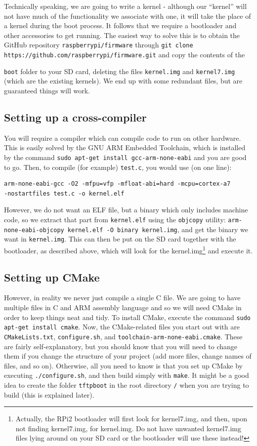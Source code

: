 \documentclass[a4paper,11pt,reqno]{amsart}
\begin{document}
Technically speaking, we are going to write a kernel - although our ``kernel'' will not have much of the functionality we associate with one, it will take the place of a kernel during the boot process. It follows that we require a bootloader and other accessories to get running. The easiest way to solve this is to obtain the GitHub repository \texttt{raspberrypi/firmware} through \texttt{git clone https://github.com/raspberrypi/firmware.git} and copy the contents of the {\texttt{boot} folder to your SD card, deleting the files \texttt{kernel.img} and \texttt{kernel7.img} (which are the existing kernels). We end up with some redundant files, but are guaranteed things will work.

\subsection{Setting up a cross-compiler}
You will require a compiler which can compile code to run on other hardware. This is easily solved by the GNU ARM Embedded Toolchain, which is installed by the command \texttt{sudo apt-get install gcc-arm-none-eabi} and you are good to go. Then, to compile (for example) \texttt{test.c}, you would use (on one line):

\begin{verbatim}
arm-none-eabi-gcc -O2 -mfpu=vfp -mfloat-abi=hard -mcpu=cortex-a7 
-nostartfiles test.c -o kernel.elf
\end{verbatim}

However, we do not want an ELF file, but a binary which only includes machine code, so we extract that part from \texttt{kernel.elf} using the \texttt{objcopy} utility: \texttt{arm-none-eabi-objcopy kernel.elf -O binary kernel.img}, and get the binary we want in \texttt{kernel.img}. This can then be put on the SD card together with the bootloader, as described above, which will look for the kernel.img\footnote{Actually, the RPi2 bootloader will first look for kernel7.img, and then, upon not finding kernel7.img, for kernel.img. Do not have unwanted kernel7.img files lying around on your SD card or the bootloader will use these instead!} and execute it.

\subsection{Setting up CMake}
However, in reality we never just compile a single C file. We are going to have multiple files in C and ARM assembly language and so we will need CMake in order to keep things neat and tidy. To install CMake, execute the command \texttt{sudo apt-get install cmake}. Now, the CMake-related files you start out with are \texttt{CMakeLists.txt}, \texttt{configure.sh}, and \texttt{toolchain-arm-none-eabi.cmake}. These are fairly self-explanatory, but you should know that you will need to change them if you change the structure of your project (add more files, change names of files, and so on). Otherwise, all you need to know is that you set up CMake by executing \texttt{./configure.sh}, and then build simply with \texttt{make}. It might be a good idea to create the folder \texttt{tftpboot} in the root directory \texttt{/} when you are trying to build (this is explained later).

}
\end{document}
